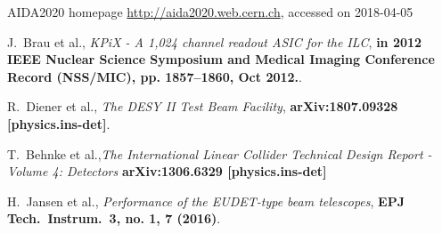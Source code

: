\footnotesize
\begin{thebibliography}{1}
 AIDA2020 homepage \url{http://aida2020.web.cern.ch}, accessed on 2018-04-05

 J.~Brau et al., {\em KPiX - A 1,024 channel readout ASIC for the ILC},
\textbf{in 2012 IEEE Nuclear Science Symposium and Medical Imaging Conference Record (NSS/MIC), pp. 1857–1860, Oct 2012.}.

 R.~Diener et al., {\em The DESY II Test Beam Facility},
\textbf{arXiv:1807.09328 [physics.ins-det]}.

  T.~Behnke et al.,{\em The International Linear Collider Technical Design Report - Volume 4: Detectors}
\textbf{arXiv:1306.6329 [physics.ins-det]}

 H.~Jansen et al., {\em Performance of the EUDET-type beam telescopes},
\textbf{EPJ Tech.\ Instrum.\  {\bf 3}, no. 1, 7 (2016)}.




\end{thebibliography}


